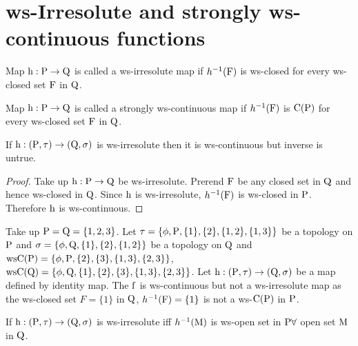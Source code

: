 \section{ws-Irresolute and strongly ws-continuous functions}\label{sec3.3}

\begin{dfn}\label{defi3.3.1}
Map $\mathrm{h}: \mathrm{P}\to  \mathrm{Q}$ is called a ws-irresolute map if $h^{-1}(\mathrm{F})$ is ws-closed for every ws-closed set $\mathrm{F}$ in $\mathrm{Q}$.
\end{dfn}

\begin{dfn}\label{defi3.3.2}
Map $\mathrm{h}: \mathrm{P}\to \mathrm{Q}$ is called a strongly ws-continuous map if $h^{-1} (\mathrm{F})$ is $\mathrm{C}(\mathrm{P})$ for every ws-closed set $\mathrm{F}$ in $\mathrm{Q}$.
\end{dfn}

\begin{thm}\label{thm3.3.3}
If $\mathrm{h}: (\mathrm{P},\tau)\to (\mathrm{Q}, \sigma)$ is ws-irresolute then it is ws-continuous but inverse is untrue.
\end{thm}

\begin{proof}
Take up $\mathrm{h}: \mathrm{P}\to \mathrm{Q}$ be ws-irresolute. Prerend $\mathrm{F}$ be any closed set in $\mathrm{Q}$ and hence ws-closed in $\mathrm{Q}$. Since $\mathrm{h}$ is ws-irresolute, $h^{-1} (\mathrm{F})$ is ws-closed in $\mathrm{P}$. Therefore $\mathrm{h}$ is ws-continuous.
\end{proof}

\begin{exm}\label{exam3.3.1}
Take up $\mathrm{P}=\mathrm{Q}= \{1, 2, 3\}$. Let $\tau =\{\phi, \mathrm{P}, \{1\}, \{2\}, \{1, 2\}, \{1, 3\}\}$ be a topology on $\mathrm{P}$ and $\sigma =\{\phi, \mathrm{Q}, \{1\}, \{2\}, \{1, 2\}\}$ be a topology on $\mathrm{Q}$ and $\mathrm{ws}\mathrm{C}(\mathrm{P}) =\{\phi, \mathrm{P}, \{2\},\{3\}, \{1, 3\},\{2, 3\}\}$, $\mathrm{ws}\mathrm{C}(\mathrm{Q})=\{\phi, \mathrm{Q}, \{1\}, \{2\},\{3\}, \{1, 3\},\{2, 3\}\}$. Let $\mathrm{h}: (\mathrm{P}, \tau)\to (\mathrm{Q}, \sigma)$ be a map defined by identity map. The $\mathrm{f}$ is ws-continuous but not a ws-irresolute map as the ws-closed set $F=\{1\}$ in $\mathrm{Q}$, $h^{-1} (\mathrm{F})=\{1\}$ is not a ws-$\mathrm{C}(\mathrm{P})$ in $\mathrm{P}$.
\end{exm}

\begin{thm}\label{thm3.3.2}
If $\mathrm{h}: (\mathrm{P}, \tau )\to (\mathrm{Q}, \sigma)$ is ws-irresolute iff $h^{-1} (\mathrm{M})$ is ws-open set in $\mathrm{P}\forall$  open set $\mathrm{M}$ in $\mathrm{Q}$.
\end{thm}

